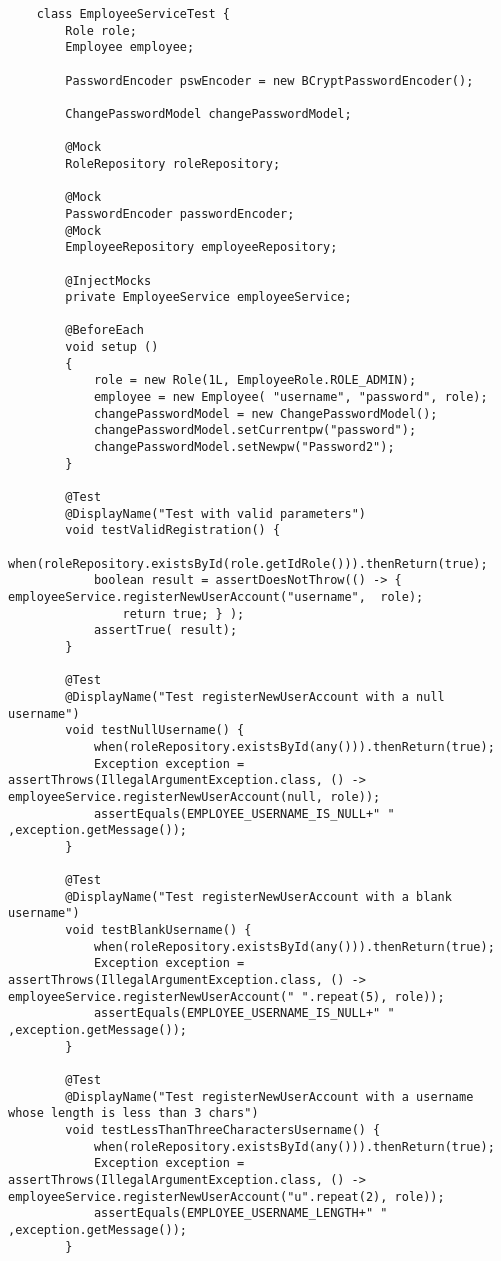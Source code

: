 \label{elsrc:EmployeeServiceTestregisterNewUserAccount}
\begin{verbatim}
	class EmployeeServiceTest {
		Role role;
		Employee employee;

		PasswordEncoder pswEncoder = new BCryptPasswordEncoder();

		ChangePasswordModel changePasswordModel;

		@Mock
		RoleRepository roleRepository;

		@Mock
		PasswordEncoder passwordEncoder;
		@Mock
		EmployeeRepository employeeRepository;

		@InjectMocks
		private EmployeeService employeeService;

		@BeforeEach
		void setup ()
		{
			role = new Role(1L, EmployeeRole.ROLE_ADMIN);
			employee = new Employee( "username", "password", role);
			changePasswordModel = new ChangePasswordModel();
			changePasswordModel.setCurrentpw("password");
			changePasswordModel.setNewpw("Password2");
		}

		@Test
		@DisplayName("Test with valid parameters")
		void testValidRegistration() {
			when(roleRepository.existsById(role.getIdRole())).thenReturn(true);
			boolean result = assertDoesNotThrow(() -> { 		employeeService.registerNewUserAccount("username",  role);
				return true; } );
			assertTrue( result);
		}

		@Test
		@DisplayName("Test registerNewUserAccount with a null username")
		void testNullUsername() {
			when(roleRepository.existsById(any())).thenReturn(true);
			Exception exception = assertThrows(IllegalArgumentException.class, () -> employeeService.registerNewUserAccount(null, role));
			assertEquals(EMPLOYEE_USERNAME_IS_NULL+" " ,exception.getMessage());
		}

		@Test
		@DisplayName("Test registerNewUserAccount with a blank username")
		void testBlankUsername() {
			when(roleRepository.existsById(any())).thenReturn(true);
			Exception exception = assertThrows(IllegalArgumentException.class, () -> employeeService.registerNewUserAccount(" ".repeat(5), role));
			assertEquals(EMPLOYEE_USERNAME_IS_NULL+" " ,exception.getMessage());
		}

		@Test
		@DisplayName("Test registerNewUserAccount with a username whose length is less than 3 chars")
		void testLessThanThreeCharactersUsername() {
			when(roleRepository.existsById(any())).thenReturn(true);
			Exception exception = assertThrows(IllegalArgumentException.class, () -> employeeService.registerNewUserAccount("u".repeat(2), role));
			assertEquals(EMPLOYEE_USERNAME_LENGTH+" " ,exception.getMessage());
		}


\end{verbatim}
